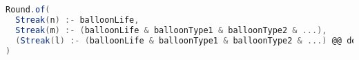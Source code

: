 \begin{lstlisting}[label=code:rounds, language=Scala, caption=Esempio di dichiarazione di un \texttt{Round} mediante DSL.]
Round.of(
  Streak(n) :- balloonLife,
  Streak(m) :- (balloonLife & balloonType1 & balloonType2 & ...),
  (Streak(l) :- (balloonLife & balloonType1 & balloonType2 & ...) @@ delay),
)
\end{lstlisting}